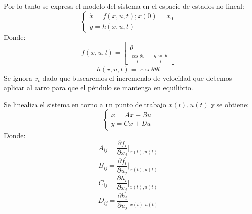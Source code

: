 \documentclass{article}
\begin{document}
                Por lo tanto se expresa el modelo del sistema en el espacio de estados no lineal:
                \begin{equation}
                    \begin{cases}
                        \dot{x} = f(x,u,t) ; x(0) = x_0 \\
                        y = h(x,u,t)
                    \end{cases}
                \end{equation}
                Donde:
                \begin{equation}
                    f(x,u,t) = \begin{bmatrix}
                        \dot{\theta} \\
                        \frac{\cos{\theta} u}{l} - \frac{g \sin{\theta}}{l}
                    \end{bmatrix}
                \end{equation}
                \begin{equation}
                    h(x,u,t) = \cos{\theta} \dot{\theta} l
                \end{equation}
                Se ignora \(\dot{x}_t\) dado que buscaremos el incremendo de velocidad que debemos aplicar al carro para que el péndulo se mantenga en equilibrio.

                Se linealiza el sistema en torno a un punto de trabajo \(x(t), u(t)\) y se obtiene:
                \begin{equation}
                    \begin{cases}
                        \dot{x} = A x + B u \\
                        y = C x + D u
                    \end{cases}
                \end{equation}
                Donde:
                \begin{equation}
                    A_{ij}= \frac{\partial f_i}{\partial x_j} \Bigg|_{x(t), u(t)}
                \end{equation}
                \begin{equation}
                    B_{ij}= \frac{\partial f_i}{\partial u_j} \Bigg|_{x(t), u(t)}
                \end{equation}
                \begin{equation}
                    C_{ij}= \frac{\partial h_i}{\partial x_j} \Bigg|_{x(t), u(t)}
                \end{equation}
                \begin{equation}
                    D_{ij}= \frac{\partial h_i}{\partial u_j} \Bigg|_{x(t), u(t)}
                \end{equation}
\end{document}
